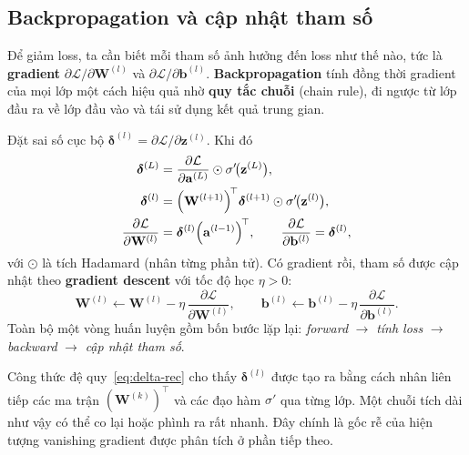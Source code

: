 \documentclass[12pt]{article}
\begin{document}
\subsection{Backpropagation và cập nhật tham số}
Để giảm loss, ta cần biết mỗi tham số ảnh hưởng đến loss như thế nào, tức là \textbf{gradient} $\partial\mathcal{L}/\partial\mathbf{W}^{(l)}$ và $\partial\mathcal{L}/\partial\mathbf{b}^{(l)}$. \textbf{Backpropagation} tính đồng thời gradient của mọi lớp một cách hiệu quả nhờ \textbf{quy tắc chuỗi} (chain rule), đi ngược từ lớp đầu ra về lớp đầu vào và tái sử dụng kết quả trung gian.

Đặt sai số cục bộ $\boldsymbol{\delta}^{(l)}=\partial\mathcal{L}/\partial\mathbf{z}^{(l)}$. Khi đó
\begin{align}
    \boldsymbol{\delta}^{(L)} &= \frac{\partial\mathcal{L}}{\partial\mathbf{a}^{(L)}}\odot\sigma'\!\bigl(\mathbf{z}^{(L)}\bigr), \label{eq:delta-out}\\
    \boldsymbol{\delta}^{(l)} &= \Bigl(\mathbf{W}^{(l+1)}\Bigr)^{\!\top}\boldsymbol{\delta}^{(l+1)}\odot\sigma'\!\bigl(\mathbf{z}^{(l)}\bigr), \label{eq:delta-rec}\\
    \frac{\partial\mathcal{L}}{\partial\mathbf{W}^{(l)}} &= \boldsymbol{\delta}^{(l)}\Bigl(\mathbf{a}^{(l-1)}\Bigr)^{\!\top},
    \qquad
    \frac{\partial\mathcal{L}}{\partial\mathbf{b}^{(l)}} = \boldsymbol{\delta}^{(l)}, \label{eq:grad}
\end{align}
với $\odot$ là tích Hadamard (nhân từng phần tử). Có gradient rồi, tham số được cập nhật theo \textbf{gradient descent} với tốc độ học $\eta>0$:
\begin{equation}
    \mathbf{W}^{(l)}\leftarrow\mathbf{W}^{(l)}-\eta\,\frac{\partial\mathcal{L}}{\partial\mathbf{W}^{(l)}},
    \qquad
    \mathbf{b}^{(l)}\leftarrow\mathbf{b}^{(l)}-\eta\,\frac{\partial\mathcal{L}}{\partial\mathbf{b}^{(l)}}.
    \label{eq:gd}
\end{equation}
Toàn bộ một vòng huấn luyện gồm bốn bước lặp lại: \emph{forward} $\rightarrow$ \emph{tính loss} $\rightarrow$ \emph{backward} $\rightarrow$ \emph{cập nhật tham số}.

\begin{notebox}
Công thức đệ quy~\eqref{eq:delta-rec} cho thấy $\boldsymbol{\delta}^{(l)}$ được tạo ra bằng cách nhân liên tiếp các ma trận $(\mathbf{W}^{(k)})^{\top}$ và các đạo hàm $\sigma'$ qua từng lớp. Một chuỗi tích dài như vậy có thể co lại hoặc phình ra rất nhanh. Đây chính là gốc rễ của hiện tượng vanishing gradient được phân tích ở phần tiếp theo.
\end{notebox}
\end{document}
